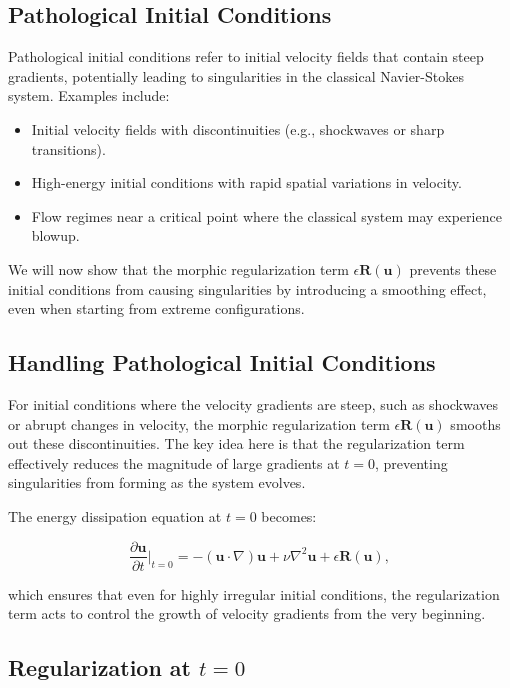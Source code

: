 \documentclass{article}
\begin{document}
\subsection*{Pathological Initial Conditions}

Pathological initial conditions refer to initial velocity fields that contain steep gradients, potentially leading to singularities in the classical Navier-Stokes system. Examples include:
\begin{itemize}
    \item Initial velocity fields with discontinuities (e.g., shockwaves or sharp transitions).
    \item High-energy initial conditions with rapid spatial variations in velocity.
    \item Flow regimes near a critical point where the classical system may experience blowup.
\end{itemize}

We will now show that the morphic regularization term \( \epsilon \mathbf{R}(\mathbf{u}) \) prevents these initial conditions from causing singularities by introducing a smoothing effect, even when starting from extreme configurations.

\subsection*{Handling Pathological Initial Conditions}

For initial conditions where the velocity gradients are steep, such as shockwaves or abrupt changes in velocity, the morphic regularization term \( \epsilon \mathbf{R}(\mathbf{u}) \) smooths out these discontinuities. The key idea here is that the regularization term effectively reduces the magnitude of large gradients at \( t = 0 \), preventing singularities from forming as the system evolves.

The energy dissipation equation at \( t = 0 \) becomes:

\[
\frac{\partial \mathbf{u}}{\partial t} \Big|_{t=0} = - (\mathbf{u} \cdot \nabla)\mathbf{u} + \nu \nabla^2 \mathbf{u} + \epsilon \mathbf{R}(\mathbf{u}),
\]

which ensures that even for highly irregular initial conditions, the regularization term acts to control the growth of velocity gradients from the very beginning.


\subsection*{Regularization at \( t = 0 \)}
\end{document}

